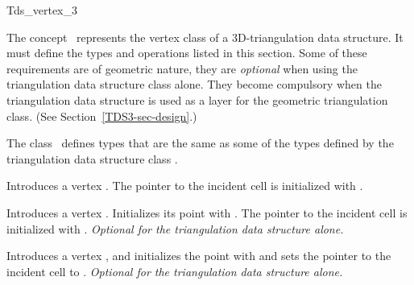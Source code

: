 

\begin{ccRefConcept}{Tds_vertex_3}


\ccDefinition
  
The concept \ccRefName\ represents the vertex class of a 3D-triangulation data structure. It must define
the types and operations listed in this section. Some of these
requirements are of geometric nature, they are \textit{optional}
when using the triangulation data structure class alone. They become
compulsory when the triangulation data structure is used as a layer
for the geometric triangulation class. (See Section~\ref{TDS3-sec-design}.)

\ccTypes
{}
\ccThreeToTwo
{} 

The class \ccClassName\ defines types that are the same as some of the 
types defined by the triangulation data structure class .

\ccGlue
{}

\ccCreation
{}  %

{Introduces a vertex \ccVar. 
The pointer to the incident cell is initialized with .}

{Introduces a vertex \ccVar. Initializes its point with .
The pointer to the incident cell is initialized with
. {\textit{Optional for the triangulation data structure alone.}}}

{Introduces a vertex \ccVar, and initializes the point with 
and sets the pointer to the incident cell to . {\textit{Optional for the
triangulation data structure alone.}}}


\end{ccRefConcept}
